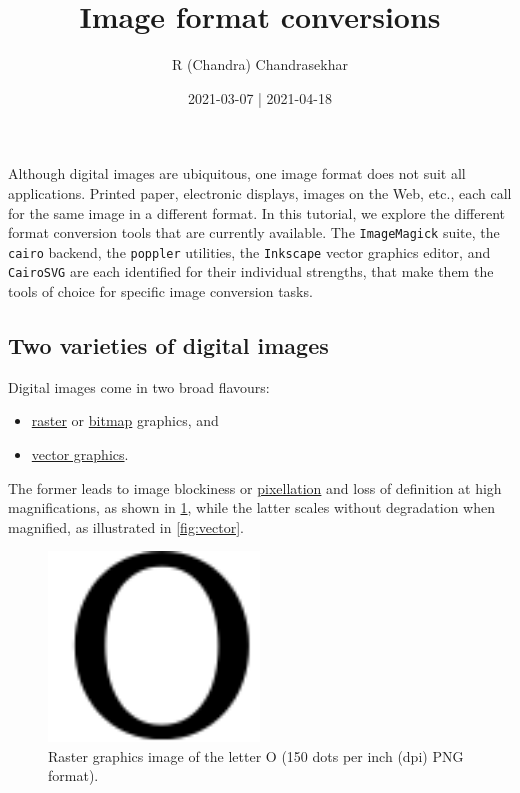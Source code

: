\documentclass[
  12pt,
  british,
  a4paper,
  rgb,
  dvipsnames,
  svgnames,
  hyphens]{article}
\title{Image format conversions}
\author{R (Chandra) Chandrasekhar}
\date{2021-03-07 | 2021-04-18}
\providecommand{\tightlist}{%
  \setlength{\itemsep}{0pt}\setlength{\parskip}{0pt}}
\begin{document}
\maketitle

\setlength{\parindent}{0pt} %
\thispagestyle{empty}


Although digital images are ubiquitous, one image format does not suit
all applications. Printed paper, electronic displays, images on the Web,
etc., each call for the same image in a different format. In this
tutorial, we explore the different format conversion tools that are
currently available. The \texttt{ImageMagick} suite, the \texttt{cairo}
backend, the \texttt{poppler} utilities, the \texttt{Inkscape} vector
graphics editor, and \texttt{CairoSVG} are each identified for their
individual strengths, that make them the tools of choice for specific
image conversion tasks.

\hypertarget{two-varieties-of-digital-images}{%
\subsection{Two varieties of digital
images}\label{two-varieties-of-digital-images}}

Digital images come in two broad flavours:

\begin{itemize}
\tightlist
\item
  \href{https://en.wikipedia.org/wiki/Raster_graphics}{raster} or
  \href{https://en.wikipedia.org/wiki/Bitmap}{bitmap} graphics, and
\item
  \href{https://en.wikipedia.org/wiki/Vector_graphics}{vector graphics}.
\end{itemize}

The former leads to image blockiness or
\href{https://en.wikipedia.org/wiki/Pixelation}{pixellation} and loss of
definition at high magnifications, as shown in \cref{fig:raster}, while
the latter scales without degradation when magnified, as illustrated in
\cref{fig:vector}.

\begin{figure}
\hypertarget{fig:raster}{%
\centering
\includegraphics[width=0.5\textwidth,height=\textheight]{images/letter-O-150-dpi.png}
\caption{Raster graphics image of the letter O (150 dots per inch (dpi)
PNG format).}\label{fig:raster}
}
\end{figure}
\end{document}
